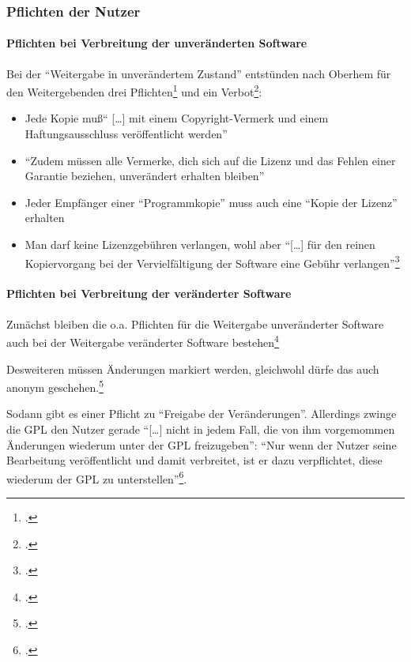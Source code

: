 \documentclass[DIV=calc,BCOR=5mm,11pt,headings=small,oneside,abstract=true, toc=bib]{scrartcl}
\begin{document}
\subsubsection{Pflichten der Nutzer}

\paragraph{Pflichten bei Verbreitung der unveränderten Software}

Bei der \enquote{Weitergabe in unverändertem Zustand} entstünden nach
Oberhem für den Weitergebenden drei Pflichten\footcite[vgl.][43]{Oberhem2008a}
und ein Verbot\footcite[vgl.][44]{Oberhem2008a}:

\begin{itemize}
  \item Jede Kopie muß\enquote{ [\ldots] mit einem Copyright-Vermerk und einem
  Haftungsausschluss veröffentlicht werden}
  \item \enquote{Zudem müssen alle Vermerke, dich sich auf die Lizenz und
  das Fehlen einer Garantie beziehen, unverändert erhalten bleiben}
  \item Jeder Empfänger einer \enquote{Programmkopie} muss auch eine
  \enquote{Kopie der Lizenz} erhalten
  \item Man darf keine Lizenzgebühren verlangen, wohl aber 
  \enquote{[\ldots] für den reinen Kopiervorgang bei der Vervielfältigung
  der Software eine Gebühr verlangen}\footcite[vgl.][44]{Oberhem2008a}
\end{itemize}

\paragraph{Pflichten bei Verbreitung der veränderter Software}

Zunächst bleiben die o.a. Pflichten für die Weitergabe unveränderter Software
auch bei der Weitergabe veränderter Software
bestehen\footcite[vgl.][44]{Oberhem2008a}

Desweiteren müssen Änderungen markiert werden, gleichwohl dürfe das auch anonym
geschehen.\footcite[vgl.][44]{Oberhem2008a}

Sodann gibt es einer Pflicht zu \enquote{Freigabe der Veränderungen}.
Allerdings zwinge die GPL den Nutzer gerade \enquote{[\ldots] nicht in
jedem Fall, die von ihm vorgemommen Änderungen wiederum unter der GPL
freizugeben}: \enquote{Nur wenn der Nutzer seine Bearbeitung
veröffentlicht und damit verbreitet, ist er dazu verpflichtet, diese
wiederum der GPL zu unterstellen}\footcite[vgl.][45]{Oberhem2008a}.
\end{document}
